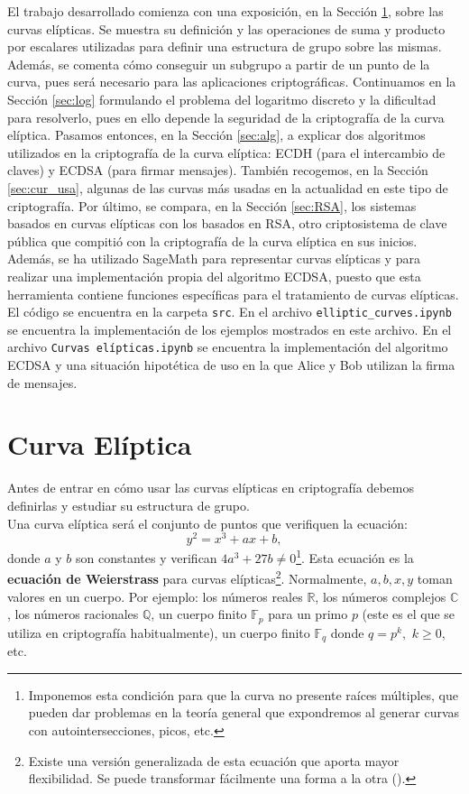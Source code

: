 \documentclass[11pt]{article}
\begin{document}
El trabajo desarrollado comienza con una exposición, en la Sección \ref{sec:curva}, sobre las curvas elípticas. Se muestra su definición y las operaciones de suma y producto por escalares utilizadas para definir una estructura de grupo sobre las mismas. Además, se comenta cómo conseguir un subgrupo a partir de un punto de la curva, pues será necesario para las aplicaciones criptográficas. Continuamos en la Sección \ref{sec:log} formulando el problema del logaritmo discreto y la dificultad para resolverlo, pues en ello depende la seguridad de la criptografía de la curva elíptica. Pasamos entonces, en la Sección \ref{sec:alg}, a explicar dos algoritmos utilizados en la criptografía de la curva elíptica: ECDH (para el intercambio de claves) y ECDSA (para firmar mensajes). También recogemos, en la Sección \ref{sec:cur_usa}, algunas de las curvas más usadas en la actualidad en este tipo de criptografía.
Por último, se compara, en la Sección \ref{sec:RSA}, los sistemas basados en curvas elípticas con los basados en RSA, otro criptosistema de clave pública que compitió con la criptografía de la curva elíptica en sus inicios.\\

Además, se ha utilizado SageMath para representar curvas elípticas y para realizar una implementación propia del algoritmo ECDSA, puesto que esta herramienta contiene funciones específicas para el tratamiento de curvas elípticas. El código se encuentra en la carpeta \texttt{src}. En el archivo \texttt{elliptic\_curves.ipynb} se encuentra la implementación de los ejemplos mostrados en este archivo. En el archivo \texttt{Curvas elípticas.ipynb} se encuentra la implementación del algoritmo ECDSA y una situación hipotética de uso en la que Alice y Bob utilizan la firma de mensajes.

\section{Curva Elíptica}
\label{sec:curva}
Antes de entrar en cómo usar las curvas elípticas en criptografía debemos definirlas y estudiar su estructura de grupo.\\

Una curva elíptica será el conjunto de puntos que verifiquen la ecuación:
\[y^2 = x^3 + ax + b,\]
donde $a$ y $b$ son constantes y verifican $4a^3+27b \neq 0$\footnote{Imponemos esta condición para que la curva no presente raíces múltiples, que pueden dar problemas en la teoría general que expondremos al generar curvas con autointersecciones, picos, etc. }. Esta ecuación es la \textbf{ecuación de Weierstrass} para curvas elípticas\footnote{Existe una versión generalizada de esta ecuación que aporta mayor flexibilidad. Se puede transformar fácilmente una forma a la otra (\cite{washington_elliptic_2008}).}. Normalmente, $a, b, x, y$ toman valores en un cuerpo. Por ejemplo: los números reales $\mathbb{R}$, los números complejos $\mathbb{C}$, los números racionales $\mathbb{Q}$, un cuerpo finito $\mathbb{F}_p$ para un primo $p$ (este es el que se utiliza en criptografía habitualmente), un cuerpo finito $\mathbb{F}_q$ donde $q = p^k,$ $k \ge 0$, etc.\\
\end{document}
